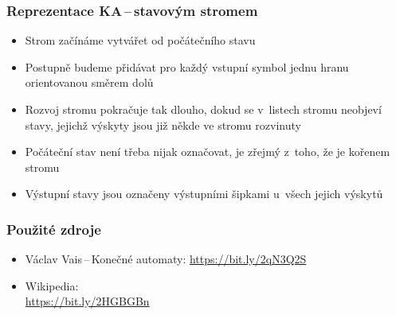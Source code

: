 \documentclass[hyperref={unicode}]{beamer}
\begin{document}
\begin{frame}
\transblindshorizontal
\frametitle{Reprezentace KA\,--\,stavovým stromem}
\begin{alertblock}{}
\begin{itemize}
\item{Strom začínáme vytvářet od počátečního stavu}
\item{Postupně budeme přidávat pro každý vstupní symbol jednu hranu orientovanou směrem dolů}
\item{Rozvoj stromu pokračuje tak dlouho, dokud se v~listech stromu neobjeví stavy, jejichž výskyty jsou již někde ve stromu rozvinuty}
\item{Počáteční stav není třeba nijak označovat, je zřejmý z~toho, že je kořenem stromu}
\item{Výstupní stavy jsou označeny výstupními šipkami u~všech jejich výskytů}
\end{itemize}
\end{alertblock}
\begin{figure}[h]
		\centering
\end{figure}
\end{frame}
\begin{frame}
\transblindshorizontal
\frametitle{{Použité zdroje}}
\begin{itemize}
\item{Václav Vais\,--\,Konečné automaty: \url{https://bit.ly/2qN3Q2S}}
\item{Wikipedia:\\ \url{https://bit.ly/2HGBGBn}}
\end{itemize}	
\end{frame}
\end{document}
